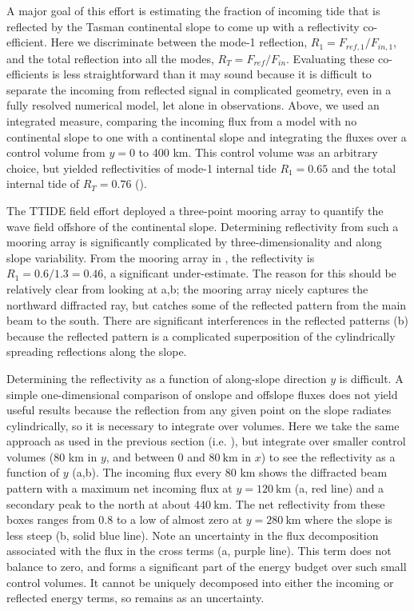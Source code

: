 \documentclass[12pt]{article}
\begin{document}
A major goal of this effort is estimating the fraction of incoming tide that is reflected by the Tasman continental slope to come up with a reflectivity co-efficient. Here we discriminate between the mode-1 reflection, $R_1=F_{ref,1}/F_{in,1}$, and the total reflection into all the modes, $R_T=F_{ref}/F_{in}$. Evaluating these co-efficients is less straightforward than it may sound because it is difficult to separate the incoming from reflected signal in complicated geometry, even in a fully resolved numerical model, let alone in observations.  Above, we used an integrated measure, comparing the incoming flux from a model with no continental slope to one with a continental slope and integrating the fluxes over a control volume from $y=$0 to 400 km.  This control volume was an arbitrary choice, but yielded reflectivities of mode-1 internal tide $R_1=0.65$ and the total internal tide of $R_T=0.76$ (). 

The TTIDE field effort deployed a three-point mooring array to quantify the wave field offshore of the continental slope.  Determining reflectivity from such a mooring array is significantly complicated by three-dimensionality and along slope variability.  From the mooring array in , the reflectivity is $R_1=0.6/1.3=0.46$, a significant under-estimate.  The reason for this should be relatively clear from looking at a,b; the mooring array nicely captures the northward diffracted ray, but catches some of the reflected pattern from the main beam to the south. There are significant interferences in the reflected patterns (b) because the reflected pattern is a complicated superposition of the cylindrically spreading reflections along the slope.  

Determining the reflectivity as a function of along-slope direction $y$ is difficult.  A simple one-dimensional comparison of onslope and offslope fluxes does not yield useful results because the reflection from any given point on the slope radiates cylindrically, so it is necessary to integrate over volumes.  Here we take the same approach as used in the previous section (i.e. ), but integrate over smaller control volumes (80 km in $y$, and between $0$ and $80\ \mathrm{km}$ in $x$) to see the reflectivity as a function of $y$ (a,b).  The incoming flux every 80 km shows the diffracted beam pattern with a maximum net incoming flux at $y=120\ \mathrm{km}$ (a, red line) and a secondary peak to the north at about $440\ \mathrm{km}$.  The net reflectivity from these boxes ranges from 0.8 to a low of almost zero at $y=280\ \mathrm{km}$ where the slope is less steep (b, solid blue line).  Note an uncertainty in the flux decomposition associated with the flux in the cross terms (a, purple line).  This term does not balance to zero, and forms a significant part of the energy budget over such small control volumes.  It cannot be uniquely decomposed into either the incoming or reflected energy terms, so remains as an uncertainty. 
\end{document}

